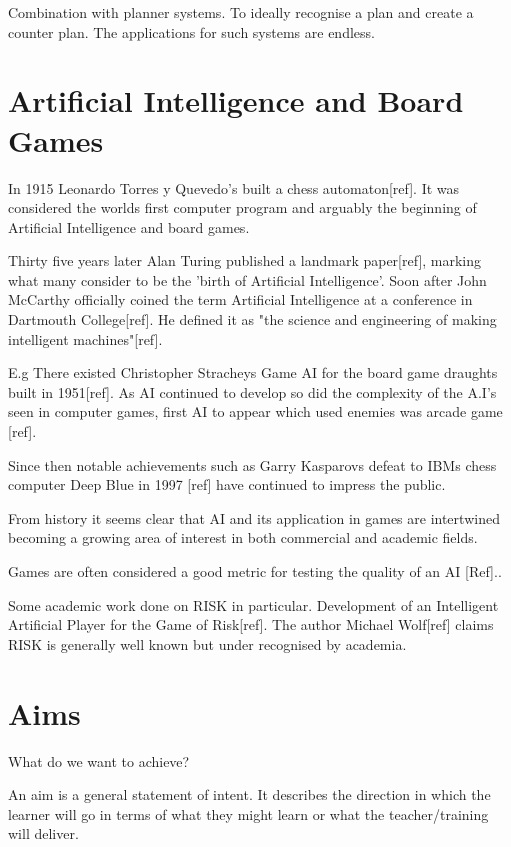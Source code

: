\documentclass[parskip]{cs4rep}
\begin{document}
Combination with planner systems. To ideally recognise a plan and create a counter plan. The applications for such systems are endless.

\section{Artificial Intelligence and Board Games}

In 1915 Leonardo Torres y Quevedo's built a chess automaton[ref]. It was considered the worlds first computer program and arguably the beginning of Artificial Intelligence and board games.

Thirty five years later Alan Turing published a landmark paper[ref], marking what many consider to be the 'birth of Artificial Intelligence'. Soon after John McCarthy officially coined the term Artificial Intelligence at a conference in Dartmouth College[ref]. He defined it as "the science and engineering of making intelligent machines"[ref].

E.g
There existed Christopher Stracheys Game AI for the board game draughts built in 1951[ref]. As AI continued to develop so did the complexity of the A.I's seen in computer games, first AI to appear which used enemies was arcade game [ref].

Since then notable achievements such as Garry Kasparovs defeat to IBMs chess computer Deep Blue in 1997 [ref] have continued to impress the public. 

From history it seems clear that AI and its application in games are intertwined becoming a growing area of interest in both commercial and academic fields.

Games are often considered a good metric for testing the quality of an AI [Ref].. 

Some academic work done on RISK in particular. Development of an Intelligent Artificial Player for the Game of Risk[ref]. The author Michael Wolf[ref] claims RISK is generally well known but under recognised by academia.

\section{Aims}

What do we want to achieve?

An aim is a general statement of intent. It describes the direction in which the learner will go in terms of what they might learn or what the teacher/training will deliver.
\end{document}
